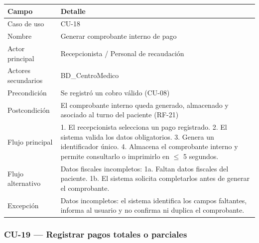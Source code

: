 \documentclass[11pt,a4paper]{article}
\begin{document}
	\begin{longtable}{p{} p{} }
		
		
		\toprule
		\textbf{Campo} &
		\textbf{Detalle}  \\
		\midrule
		\endhead
		
		Caso de uso & CU-18 \\
		Nombre & Generar comprobante interno de pago \\
		Actor principal & Recepcionista / Personal de recaudación \\
		Actores secundarios & BD\_CentroMedico \\
		Precondición & Se registró un cobro válido (CU-08) \\
		Postcondición & El comprobante interno queda generado, almacenado y asociado al turno del paciente (RF-21) \\
		Flujo principal & 1. El recepcionista selecciona un pago registrado. 2. El sistema valida los datos obligatorios. 3. Genera un identificador único. 4. Almacena el comprobante interno y permite consultarlo o imprimirlo en \(\leq\) 5 segundos. \\
		Flujo alternativo & Datos fiscales incompletos: 1a. Faltan datos fiscales del paciente. 1b. El sistema solicita completarlos antes de generar el comprobante. \\
		Excepción & Datos incompletos: el sistema identifica los campos faltantes, informa al usuario y no confirma ni duplica el comprobante. \\
		\bottomrule
	\end{longtable}
	
	\subsubsection{CU-19 --- Registrar pagos totales o parciales}
	
\end{document}
